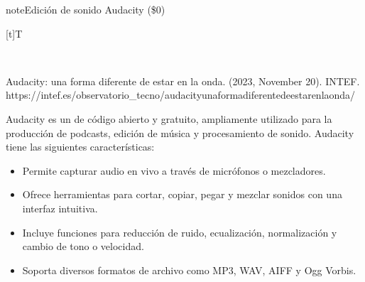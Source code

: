 \documentclass[letterpaper,10pt,spanish]{sphinxmanual}
\let\sphinxpxdimen\pdfpxdimen\else\newdimen\sphinxpxdimen
\begin{document}
\begin{sphinxadmonition}{note}{Edición de sonido Audacity (\$0)}


\begin{savenotes}\sphinxattablestart
\sphinxthistablewithglobalstyle
\centering
\begin{tabulary}{\linewidth}[t]{T}
\sphinxtoprule
\sphinxtableatstartofbodyhook

\begin{sphinxfigure-in-table}
\centering
\capstart
\noindent\sphinxincludegraphics[width=360\sphinxpxdimen]{{image073}.png}
\label{\detokenize{1_guias/10ofimatica/G1012:id47}}\end{sphinxfigure-in-table}\relax
\\
\sphinxbottomrule
\end{tabulary}
\sphinxtableafterendhook\par
\sphinxattableend\end{savenotes}

\sphinxAtStartPar
%
\begin{footnote}[9]\sphinxAtStartFootnote
Audacity: una forma diferente de estar en la onda. (2023, November 20). INTEF. https://intef.es/observatorio\_tecno/audacity\sphinxhyphen{}una\sphinxhyphen{}forma\sphinxhyphen{}diferente\sphinxhyphen{}de\sphinxhyphen{}estar\sphinxhyphen{}en\sphinxhyphen{}la\sphinxhyphen{}onda/
%
\end{footnote} Audacity es un  de código abierto y gratuito, ampliamente utilizado para la producción de podcasts, edición de música y procesamiento de sonido. Audacity tiene las siguientes características:
\begin{itemize}
\item {} 
\sphinxAtStartPar
{} Permite capturar audio en vivo a través de micrófonos o mezcladores.

\item {} 
\sphinxAtStartPar
{} Ofrece herramientas para cortar, copiar, pegar y mezclar sonidos con una interfaz intuitiva.

\item {} 
\sphinxAtStartPar
{} Incluye funciones para reducción de ruido, ecualización, normalización y cambio de tono o velocidad.

\item {} 
\sphinxAtStartPar
{} Soporta diversos formatos de archivo como MP3, WAV, AIFF y Ogg Vorbis.

\end{itemize}
\end{sphinxadmonition}
\end{document}
